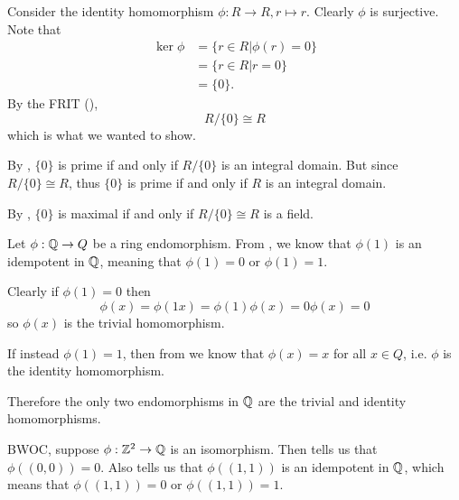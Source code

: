 \begin{questions}
    \item \begin{partquestions}{\roman*}
        \item Consider the identity homomorphism $\phi: R \to R, r \mapsto r$. Clearly $\phi$ is surjective. Note that
        \begin{align*}
            \ker\phi &= \{r \in R \vert \phi(r) = 0\}\\
            &= \{r \in R \vert r = 0\}\\
            &= \{0\}.
        \end{align*}
        By the FRIT (),
        \[
            R / \{0\} \cong R
        \]
        which is what we wanted to show.

        \item By , $\{0\}$ is prime if and only if $R/\{0\}$ is an integral domain. But since $R/\{0\} \cong R$, thus $\{0\}$ is prime if and only if $R$ is an integral domain.
        
        \item By , $\{0\}$ is maximal if and only if $R/\{0\} \cong R$ is a field.
    \end{partquestions}

    \item Let $\phi: \mathbb{Q} \to Q$ be a ring endomorphism. From , we know that $\phi(1)$ is an idempotent in $\mathbb{Q}$, meaning that $\phi(1) = 0$ or $\phi(1) = 1$.
    
    Clearly if $\phi(1) = 0$ then
    \[
        \phi(x) = \phi(1x) = \phi(1)\phi(x) = 0\phi(x) = 0
    \]
    so $\phi(x)$ is the trivial homomorphism.
    
    If instead $\phi(1) = 1$, then from  we know that $\phi(x) = x$ for all $x \in Q$, i.e. $\phi$ is the identity homomorphism.

    Therefore the only two endomorphisms in $\mathbb{Q}$ are the trivial and identity homomorphisms.

    \item BWOC, suppose $\phi: \mathbb{Z}^2 \to \mathbb{Q}$ is an isomorphism. Then  tells us that $\phi((0,0)) = 0$. Also  tells us that $\phi((1,1))$ is an idempotent in $\mathbb{Q}$, which means that $\phi((1,1)) = 0$ or $\phi((1,1)) = 1$.
    

\end{questions}
